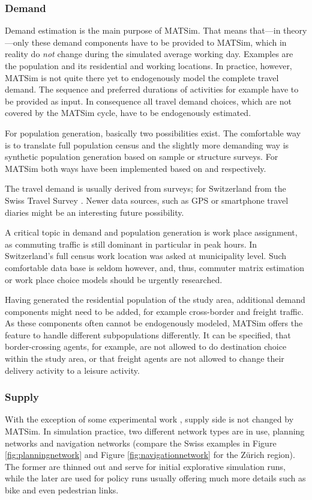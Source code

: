 \subsubsection{Demand}
Demand estimation is the main purpose of MATSim. That means that---in theory---only these demand components have to be provided to MATSim, which in reality do \emph{not} change during the simulated average working day. Examples are the population and its residential and working locations. In practice, however, MATSim is not quite there yet to endogenously model the complete travel demand. The sequence and preferred durations of activities for example have to be provided as input. In consequence all travel demand choices, which are not covered by the MATSim cycle, have to be endogenously estimated. 

For population generation, basically two possibilities exist. The comfortable way is to translate full population census and the slightly more demanding way is synthetic population generation \citep[e.g.,\,][]{GuoBhat_TRR_2007} based on sample or structure surveys. For MATSim both ways have been implemented based on \citet[][]{BfS_VZ_2000} and \citet[][]{Mueller_unpub_STRC_2011} respectively.

The travel demand is usually derived from surveys; for Switzerland from the Swiss Travel Survey \citep[][]{BfS-MZ2005_manual_2006}. Newer data sources, such as GPS or smartphone travel diaries might be an interesting future possibility.

A critical topic in demand and population generation is work place assignment, as commuting traffic is still dominant in particular in peak hours. In Switzerland's full census work location was asked at municipality level. Such comfortable data base is seldom however, and, thus, commuter matrix estimation or work place choice models should be urgently researched.

Having generated the residential population of the study area, additional demand components might need to be added, for example cross-border and freight traffic. As these components often cannot be endogenously modeled, MATSim offers the feature to handle different subpopulations differently. It can be specified, that border-crossing agents, for example, are not allowed to do destination choice within the study area, or that freight agents are not allowed to change their delivery activity to a leisure activity.

\subsubsection{Supply}
With the exception of some experimental work \citep[][]{HorniEtAl_TechRep_IVT_2012}, supply side is not changed by MATSim. In simulation practice, two different network types are in use, planning networks and navigation networks (compare the Swiss examples in Figure \ref{fig:planningnetwork} and Figure \ref{fig:navigationnetwork} for the Zürich region). The former are thinned out and serve for initial explorative simulation runs, while the later are used for policy runs usually offering much more details such as bike and even pedestrian links.


